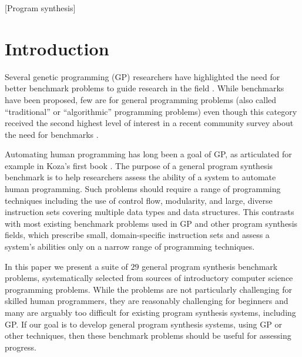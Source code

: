 \documentclass{sig-alternate}
\begin{document}
[Program synthesis]




\section{Introduction}

Several genetic programming (GP) researchers have highlighted the need for better benchmark problems to guide research in the field \cite{McDermott:2012:GECCO, White:2013:BGB:2441218.2441242, Woodward:2014:GECCOcomp}. While benchmarks have been proposed, few are for general programming problems (also called ``traditional'' or ``algorithmic'' programming problems) even though this category received the second highest level of interest in a recent community survey about the need for benchmarks \cite{White:2013:BGB:2441218.2441242}. 

Automating human programming has long been a goal of GP, as articulated for example in Koza's first book \cite{koza:book}. The purpose of a general program synthesis benchmark is to help researchers assess the ability of a system to automate human programming. Such problems should require a range of programming techniques including the use of control flow, modularity, and large, diverse instruction sets covering multiple data types and data structures. This contrasts with most existing benchmark problems used in GP and other program synthesis fields, which prescribe small, domain-specific instruction sets and assess a system's abilities only on a narrow range of programming techniques.

In this paper we present a suite of $29$ general program synthesis benchmark problems, systematically selected from sources of introductory computer science programming problems. While the problems are not particularly challenging for skilled human programmers, they are reasonably challenging for beginners and many are arguably too difficult for existing program synthesis systems, including GP. If our goal is to develop general program synthesis systems, using GP or other techniques, then these benchmark problems should be useful for assessing progress.
\end{document}
